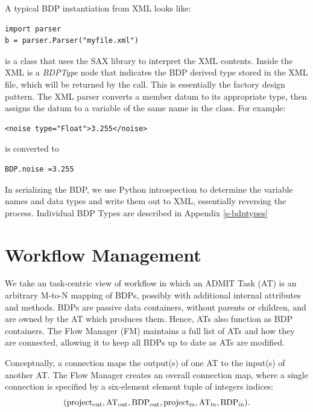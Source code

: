 \documentclass[preprint]{aastex}
\begin{document}
A typical BDP instantiation from XML looks like:

\begin{verbatim}
import parser
b = parser.Parser("myfile.xml")
\end{verbatim}

 is a class that uses the SAX library to interpret the
XML contents.  Inside the XML is a {\it BDPType} node that indicates
the BDP derived type stored in the XML file, which will be returned
by the call. This is essentially the factory design pattern.
The XML parser converts a member datum to its appropriate type, then 
assigns the datum to a variable of the same name in the class.
For example:
\begin{verbatim}
<noise type="Float">3.255</noise>
\end{verbatim}
is converted to
\begin{verbatim}
BDP.noise =3.255
\end{verbatim}
\noindent
In serializing the BDP, we use Python introspection to determine the
variable names and data types and write them out to XML, essentially
reversing the process.  Individual BDP Types are described in
Appendix \ref{s-bdptypes}


\section{Workflow Management}\label{s-workflow}

We take an task-centric view of workflow in which an ADMIT Task (AT)
is an arbitrary M-to-N mapping of BDPs, possibly with additional
internal attributes and methods.  BDPs are passive
data containers, without parents or children, and are owned by the AT
which produces them. Hence, ATs also function as BDP containers.
The Flow Manager (FM) maintains a full list of ATs and how they are
connected, allowing it to keep all BDPs up to date as ATs are modified.

Conceptually, a connection maps the output(s) of one AT to the input(s) of another AT. The Flow Manager creates an overall connection map, where a single 
connection is specified by a six-element element tuple of integers indices: 
$$
({\rm project_{out},AT_{out},BDP_{out},project_{in},AT_{in},BDP_{in}}).
$$
\end{document}
